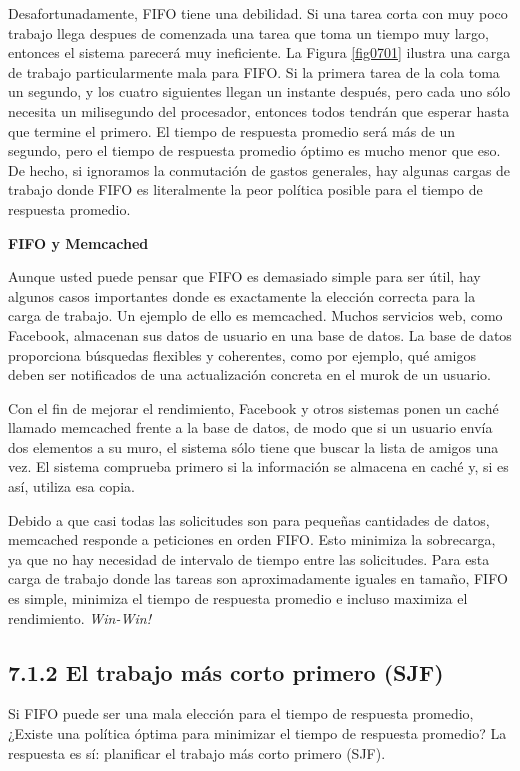 \documentclass[10pt]{book}
\begin{document}
Desafortunadamente, FIFO tiene una debilidad. Si una tarea corta con muy poco trabajo llega despues de comenzada una tarea que toma un tiempo muy largo, entonces el sistema parecerá muy ineficiente. La Figura \ref{fig0701} ilustra una carga de trabajo particularmente mala para FIFO. Si la primera tarea de la cola toma un segundo, y los cuatro siguientes llegan un instante después, pero cada uno sólo necesita un milisegundo del procesador, entonces todos tendrán que esperar hasta que termine el primero. El tiempo de respuesta promedio será más de un segundo, pero el tiempo de respuesta promedio óptimo es mucho menor que eso. De hecho, si ignoramos la conmutación de gastos generales, hay algunas cargas de trabajo donde FIFO es literalmente la peor política posible para el tiempo de respuesta promedio.

\textbf{FIFO y Memcached}

Aunque usted puede pensar que FIFO es demasiado simple para ser útil, hay algunos casos importantes donde es exactamente la elección correcta para la carga de trabajo. Un ejemplo de ello es memcached. Muchos servicios web, como Facebook, almacenan sus datos de usuario en una base de datos. La base de datos proporciona búsquedas flexibles y coherentes, como por ejemplo, qué amigos deben ser notificados de una actualización concreta en el murok de un usuario.

Con el fin de mejorar el rendimiento, Facebook y otros sistemas ponen un caché llamado memcached frente a la base de datos, de modo que si un usuario envía dos elementos a su muro, el sistema sólo tiene que buscar la lista de amigos una vez. El sistema comprueba primero si la información se almacena en caché y, si es así, utiliza esa copia.

Debido a que casi todas las solicitudes son para pequeñas cantidades de datos, memcached responde a peticiones en orden FIFO. Esto minimiza la sobrecarga, ya que no hay necesidad de intervalo de tiempo entre las solicitudes. Para esta carga de trabajo donde las tareas son aproximadamente iguales en tamaño, FIFO es simple, minimiza el tiempo de respuesta promedio e incluso maximiza el rendimiento. \textit{Win-Win!}

\subsection{7.1.2 El trabajo más corto primero (SJF)}
Si FIFO puede ser una mala elección para el tiempo de respuesta promedio, ¿Existe una política óptima para minimizar el tiempo de respuesta promedio? La respuesta es sí: planificar el trabajo más corto primero (SJF).
\end{document}
